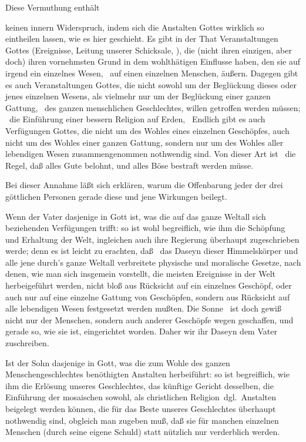 \begin{aufza}
\item Diese Vermuthung enthält 
\begin{aufzb}
\item keinen innern Widerspruch, indem sich die Anstalten Gottes wirklich so eintheilen lassen, wie es hier geschieht. Es gibt in der That Veranstaltungen Gottes (Ereignisse, Leitung unserer Schicksale, \udgl ), die (nicht ihren einzigen, aber doch) ihren vornehmsten Grund in dem wohlthätigen Einflusse haben, den sie auf irgend ein einzelnes Wesen, \zB\ auf einen einzelnen Menschen, äußern. Dagegen gibt es auch Veranstaltungen Gottes, die nicht sowohl um der Beglückung dieses oder jenes einzelnen Wesens, als vielmehr nur um der Beglückung einer ganzen Gattung, \zB\ des ganzen menschlichen Geschlechtes, willen getroffen werden müssen; \zB\ die Einführung einer bessern Religion auf Erden, \udgl\  Endlich gibt es auch Verfügungen Gottes, die nicht um des Wohles eines einzelnen Geschöpfes, auch nicht um des Wohles einer ganzen Gattung, sondern nur um des Wohles aller lebendigen Wesen zusammengenommen nothwendig sind. Von dieser Art ist \zB\ die Regel, daß alles Gute belohnt, und alles Böse bestraft werden müsse.
\item Bei dieser Annahme läßt sich erklären, warum die Offenbarung jeder der drei göttlichen Personen gerade diese und jene Wirkungen beilegt.
\begin{aufzc}
\item Wenn der Vater dasjenige in Gott ist, was die auf das ganze Weltall sich beziehenden Verfügungen trifft: so ist wohl begreiflich, wie ihm die Schöpfung und Erhaltung der Welt, ingleichen auch ihre Regierung überhaupt zugeschrieben werde; denn es ist leicht zu erachten, daß \zB\ das Daseyn dieser Himmelskörper und alle jene durch's ganze Weltall verbreitete physische und moralische Gesetze, nach denen, wie man sich insgemein vorstellt, die meisten Ereignisse in der Welt herbeigeführt werden, nicht bloß aus Rücksicht auf ein einzelnes Geschöpf, oder auch nur auf eine einzelne Gattung von Geschöpfen, sondern aus Rücksicht auf alle lebendigen Wesen festgesetzt werden mußten. Die Sonne \zB\ ist doch gewiß nicht nur der Menschen, sondern auch anderer Geschöpfe wegen geschaffen, und gerade so, wie sie ist, eingerichtet worden. Daher wir ihr Daseyn dem Vater zuschreiben.
\item Ist der Sohn dasjenige in Gott, was die zum Wohle des ganzen Menschengeschlechtes benöthigten Anstalten herbeiführt: so ist begreiflich, wie ihm die Erlösung unseres Geschlechtes, das künftige Gericht desselben, die Einführung der mosaischen sowohl, als christlichen Religion \ua\,dgl.\ Anstalten beigelegt werden können, die für das Beste unseres Geschlechtes überhaupt nothwendig sind, obgleich man zugeben muß, daß sie für manchen einzelnen Menschen (durch seine eigene Schuld) statt nützlich nur verderblich werden.
\end{aufzc}


\end{aufzb}
\end{aufza}

